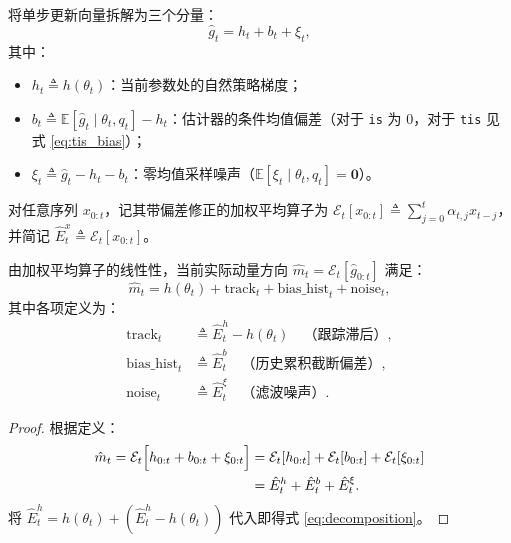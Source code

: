 \documentclass[11pt, a4paper, UTF8]{ctexart}
\begin{document}
将单步更新向量拆解为三个分量：
\begin{equation}
    \hat{g}_t = h_t + b_t + \xi_t,
\end{equation}
其中：
\begin{itemize}[leftmargin=2em]
    \item $h_t \triangleq h(\theta_t)$：当前参数处的自然策略梯度；
    \item $b_t \triangleq \mathbb{E}[\hat{g}_t \mid \theta_t, q_t] - h_t$：估计器的条件均值偏差（对于 \texttt{is} 为 0，对于 \texttt{tis} 见式 \eqref{eq:tis_bias}）；
    \item $\xi_t \triangleq \hat{g}_t - h_t - b_t$：零均值采样噪声（$\mathbb{E}[\xi_t \mid \theta_t, q_t] = \mathbf{0}$）。
\end{itemize}

对任意序列 $x_{0:t}$，记其带偏差修正的加权平均算子为 $\mathcal{E}_t[x_{0:t}] \triangleq \sum_{j=0}^t \alpha_{t, j} x_{t-j}$，并简记 $\hat{E}^x_t \triangleq \mathcal{E}_t[x_{0:t}]$。

\begin{derivbox}
由加权平均算子的线性性，当前实际动量方向 $\hat{m}_t = \mathcal{E}_t[\hat{g}_{0:t}]$ 满足：
\begin{equation}
    \hat{m}_t = h(\theta_t) + \mathrm{track}_t + \mathrm{bias\_hist}_t + \mathrm{noise}_t,
    \label{eq:decomposition}
\end{equation}
其中各项定义为：
\begin{align}
    \mathrm{track}_t &\triangleq \hat{E}^h_t - h(\theta_t) \quad \text{（跟踪滞后）}, \\
    \mathrm{bias\_hist}_t &\triangleq \hat{E}^b_t \quad \text{（历史累积截断偏差）}, \\
    \mathrm{noise}_t &\triangleq \hat{E}^\xi_t \quad \text{（滤波噪声）}.
\end{align}
\end{derivbox}

\begin{proof}
根据定义：
\begin{align}
    \hat{m}_t = \mathcal{E}_t\Big[ h_{0:t} + b_{0:t} + \xi_{0:t} \Big] &= \mathcal{E}_t[h_{0:t}] + \mathcal{E}_t[b_{0:t}] + \mathcal{E}_t[\xi_{0:t}] \notag \\
    &= \hat{E}^h_t + \hat{E}^b_t + \hat{E}^\xi_t.
\end{align}
将 $\hat{E}^h_t = h(\theta_t) + (\hat{E}^h_t - h(\theta_t))$ 代入即得式 \eqref{eq:decomposition}。
\end{proof}
\end{document}
